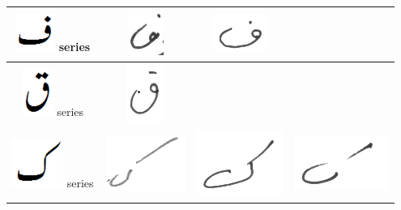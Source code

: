 \begin{table}[h]
\begin{tabular}{@{}cccc@{}}
\hline
\includegraphics[scale=0.25]{fay_orig} series & \includegraphics[scale=0.25]{faay} & \includegraphics[scale=0.25]{23}  &  \\
\hline
\includegraphics[scale=0.20]{qaaf_orig} series & \includegraphics[scale=0.15]{kahf} & & \\
\hline
\includegraphics[scale=0.15]{kaaf_orig} series & \includegraphics[scale=0.15]{kaaf2} & \includegraphics[scale=0.15]{kaaf3}  & 
\includegraphics[scale=0.15]{kaaf} \\
\hline

\end{tabular}
\end{table}
